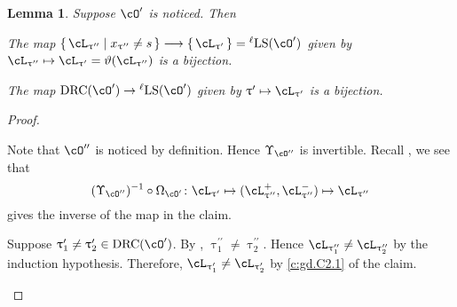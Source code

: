 \documentclass[12pt,a4paper]{amsart}
\numberwithin{equation}{section}
\newtheorem{lem}[thm]{Lemma}
\newtheorem{prop}[thm]{Proposition}
\theoremstyle{remark}
\def\drc{\mathrm{DRC}}
\def\LLS{\mathrm{{}^{\ell} LS}}
\def\cOp{\cO^{\prime}}
\def\cOpp{\cO^{\prime\prime}}
\def\pcL{\cL^+}
\def\ncL{\cL^-}
\def\uptaup{\uptau^{\prime}}
\def\uptaupp{\uptau^{\prime\prime}}
\begin{document}


\begin{lem}\label{c:gd.C2}
  Suppose $\cOp$ is noticed. Then
  \begin{enumT}
    \item \label{c:gd.C2.1}The map
$\set{\cL_{\uptaupp}| x_{\uptaupp}\neq s}\longrightarrow \set{\cL_{\uptaup}}=\LLS(\cOp)$ given by
$\cL_{\uptaupp}\mapsto \cL_{\uptaup}=\vartheta(\cL_{\uptaupp})$ is a bijection.
\item
The map $\drc(\cOp)\rightarrow \LLS(\cOp)$ given by $\uptaup\mapsto \cL_{\uptaup}$ is a bijection.
\end{enumT}
\end{lem}
\begin{proof} %
  \begin{enumPF}
    \item
  Note that $\cOpp$ is noticed by definition. Hence $\Upsilon_{\cOpp}$ is invertible.
  Recall , we see that
  \[
    (\Upsilon_{\cOpp})^{-1}\circ \Omega_{\cOp}\colon
    \cL_{\uptaup}\mapsto (\pcL_{\uptaupp},\ncL_{\uptaupp})\mapsto \cL_{\uptaupp}
  \]
  gives the inverse of the map in the claim.
  \item
  Suppose $\uptaup_{1}\neq \uptaup_{2}\in \drc(\cOp)$. By ,
  $\uptaupp_{1}\neq \uptaupp_{2}$. Hence
  $\cL_{\uptaupp_{1}}\neq\cL_{\uptaupp_{2}}$ by the induction hypothesis.
  Therefore, $\cL_{\uptaup_{1}}\neq \cL_{\uptaup_{2}}$ by \ref{c:gd.C2.1}
  of the claim.
\end{enumPF}
\end{proof}
\end{document}
